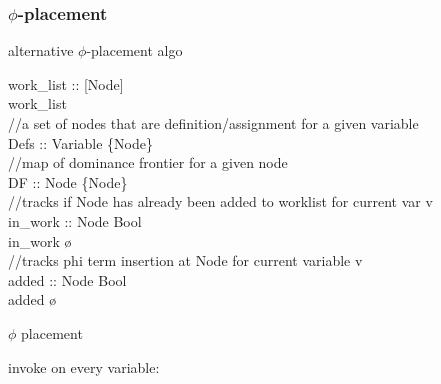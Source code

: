 \documentclass[8pt]{extarticle}
\begin{document}
\begin{multicols*}{2}
  \subsubsection{$\phi$-placement \cite{wolfebook}}
  alternative $\phi$-placement algo\\
  \begin{algorithm}[H]
    work\_list :: [Node]\\
    work\_list \leftarrow [\ ]\\
    //a set of nodes that are definition/assignment for a given variable\\
    Defs :: Variable \rightarrow \{Node\}\\
    //map of dominance frontier for a given node\\
    DF :: Node \rightarrow \{Node\}\\
    //tracks if Node has already been added to worklist for current var v\\
    in\_work :: Node \rightarrow Bool\\
    in\_work \leftarrow \o\\
    //tracks phi term insertion at Node for current variable v\\
    added :: Node \rightarrow Bool\\
    added \leftarrow \o\\
    \caption{$\phi$ placement\label{Algo_phi_placement}}
  \end{algorithm}

  invoke on every variable:


\end{multicols*}
\end{document}
